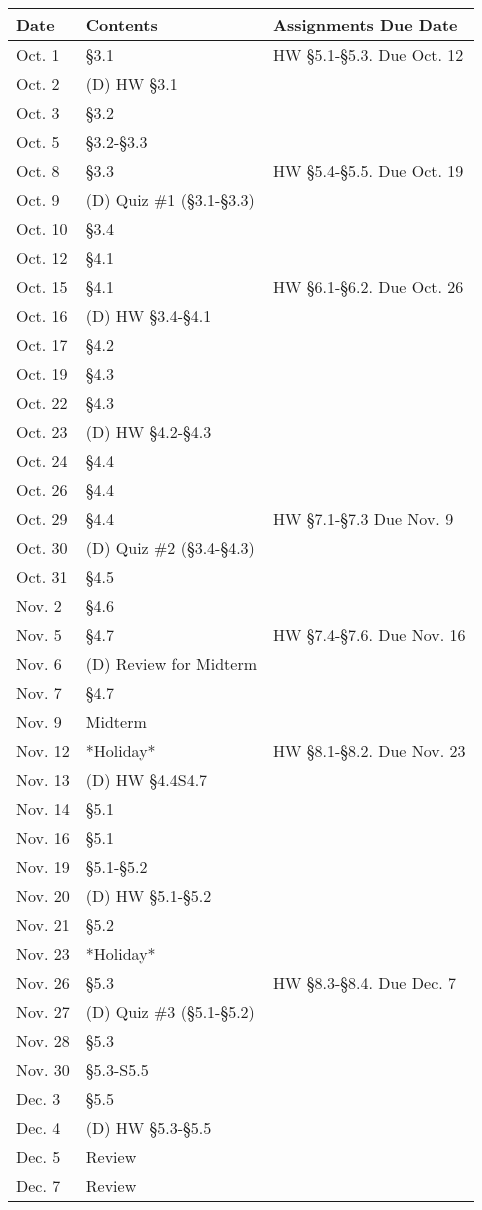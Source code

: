 \documentclass[10pt]{amsart}%
\begin{document}
%
\normalsize%
\begin{tabular}{|l|l|l|}%
\hline%
\textbf{Date}&\textbf{Contents}&\textbf{Assignments Due Date}\\%
\hline%
Oct. 1&\S3.1&HW \S5.1-\S5.3. Due Oct. 12\\%
Oct. 2&(D) HW \S3.1&\\%
Oct. 3&\S3.2&\\%
Oct. 5&\S3.2-\S3.3&\\%
\hline%
Oct. 8&\S3.3&HW \S5.4-\S5.5. Due Oct. 19\\%
Oct. 9&(D) Quiz \#1 (\S3.1-\S3.3)&\\%
Oct. 10&\S3.4&\\%
Oct. 12&\S4.1&\\%
\hline%
Oct. 15&\S4.1&HW \S6.1-\S6.2. Due Oct. 26\\%
Oct. 16&(D) HW \S3.4-\S4.1&\\%
Oct. 17&\S4.2&\\%
Oct. 19&\S4.3&\\%
\hline%
Oct. 22&\S4.3&\\%
Oct. 23&(D) HW \S4.2-\S4.3&\\%
Oct. 24&\S4.4&\\%
Oct. 26&\S4.4&\\%
\hline%
Oct. 29&\S4.4&HW \S7.1-\S7.3 Due Nov. 9\\%
Oct. 30&(D) Quiz \#2 (\S3.4-\S4.3)&\\%
Oct. 31&\S4.5&\\%
Nov. 2&\S4.6&\\%
\hline%
Nov. 5&\S4.7&HW \S7.4-\S7.6. Due Nov. 16\\%
Nov. 6&(D) Review for Midterm&\\%
Nov. 7&\S4.7&\\%
Nov. 9&Midterm&\\%
\hline%
Nov. 12&*Holiday*&HW \S8.1-\S8.2. Due Nov. 23\\%
Nov. 13&(D) HW \S4.4S4.7&\\%
Nov. 14&\S5.1&\\%
Nov. 16&\S5.1&\\%
\hline%
Nov. 19&\S5.1-\S5.2&\\%
Nov. 20&(D) HW \S5.1-\S5.2&\\%
Nov. 21&\S5.2&\\%
Nov. 23&*Holiday*&\\%
\hline%
Nov. 26&\S5.3&HW \S8.3-\S8.4. Due Dec. 7\\%
Nov. 27&(D) Quiz \#3 (\S5.1-\S5.2)&\\%
Nov. 28&\S5.3&\\%
Nov. 30&\S5.3-S5.5&\\%
\hline%
Dec. 3&\S5.5&\\%
Dec. 4&(D) HW \S5.3-\S5.5&\\%
Dec. 5&Review&\\%
Dec. 7&Review&\\%
\hline%
\end{tabular}%
\end{document}
